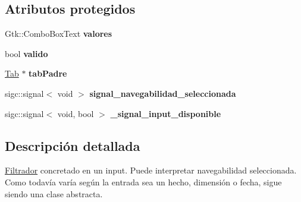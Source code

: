 \subsection*{\-Atributos protegidos}
\begin{DoxyCompactItemize}
\item 
\hypertarget{classFiltradorInput_a4f0f46abfa1c45f653f39192760f5941}{\-Gtk\-::\-Combo\-Box\-Text {\bfseries valores}}\label{classFiltradorInput_a4f0f46abfa1c45f653f39192760f5941}

\item 
\hypertarget{classFiltradorInput_a9724b0fac6158d2f7b837b7f89f5ccdc}{bool {\bfseries valido}}\label{classFiltradorInput_a9724b0fac6158d2f7b837b7f89f5ccdc}

\item 
\hypertarget{classFiltradorInput_aa3ff49b92eca82bcbc5ceeb0d62cec28}{\hyperlink{classTab}{\-Tab} $\ast$ {\bfseries tab\-Padre}}\label{classFiltradorInput_aa3ff49b92eca82bcbc5ceeb0d62cec28}

\item 
\hypertarget{classFiltradorInput_a02476cd0aaba6694408262b53de60695}{sigc\-::signal$<$ void $>$ {\bfseries signal\-\_\-navegabilidad\-\_\-seleccionada}}\label{classFiltradorInput_a02476cd0aaba6694408262b53de60695}

\item 
\hypertarget{classFiltradorInput_a224415e45d4b0cbf4c33388760a7646f}{sigc\-::signal$<$ void, bool $>$ {\bfseries \-\_\-signal\-\_\-input\-\_\-disponible}}\label{classFiltradorInput_a224415e45d4b0cbf4c33388760a7646f}

\end{DoxyCompactItemize}


\subsection{\-Descripción detallada}
\hyperlink{classFiltrador}{\-Filtrador} concretado en un input. \-Puede interpretar navegabilidad seleccionada. \-Como todavía varía según la entrada sea un hecho, dimensión o fecha, sigue siendo una clase abstracta. 

